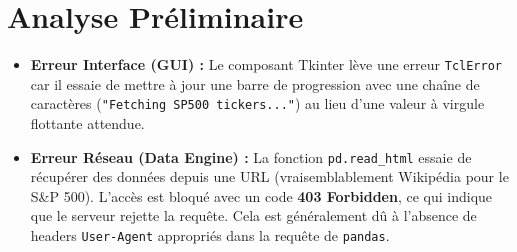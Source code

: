 \documentclass[12pt,a4paper]{article}
\begin{document}
\section*{Analyse Préliminaire}
\begin{itemize}
    \item \textbf{Erreur Interface (GUI) :} Le composant Tkinter lève une erreur \texttt{TclError} car il essaie de mettre à jour une barre de progression avec une chaîne de caractères (\texttt{"Fetching SP500 tickers..."}) au lieu d'une valeur à virgule flottante attendue.
    \item \textbf{Erreur Réseau (Data Engine) :} La fonction \texttt{pd.read\_html} essaie de récupérer des données depuis une URL (vraisemblablement Wikipédia pour le S\&P 500). L'accès est bloqué avec un code \textbf{403 Forbidden}, ce qui indique que le serveur rejette la requête. Cela est généralement dû à l'absence de headers \texttt{User-Agent} appropriés dans la requête de \texttt{pandas}.
\end{itemize}
\end{document}

